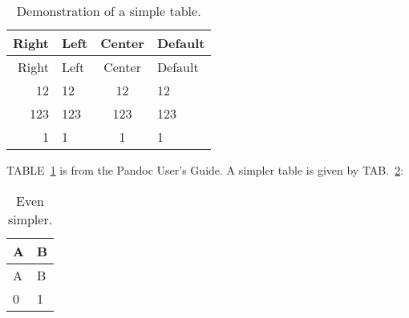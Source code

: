 \providecommand{\crefformat}[2]{}
\providecommand{\Crefformat}[2]{}
\crefformat{table}{TAB.~#2#1#3}
\Crefformat{table}{TABLE~#2#1#3}

\providecommand{\plusnamesingular}{}
\providecommand{\starnamesingular}{}
\providecommand{\cref}{\plusnamesingular~\ref}
\providecommand{\Cref}{\starnamesingular~\ref}

\begin{longtable}[]{@{}rlcl@{}}
\caption{Demonstration of a simple table. \label{tbl:1}}\tabularnewline
\toprule
Right & Left & Center & Default\tabularnewline
\midrule
\endfirsthead
\toprule
Right & Left & Center & Default\tabularnewline
\midrule
\endhead
12 & 12 & 12 & 12\tabularnewline
123 & 123 & 123 & 123\tabularnewline
1 & 1 & 1 & 1\tabularnewline
\bottomrule
\end{longtable}

\protect\renewcommand{\starnamesingular}{TABLE}\Cref{tbl:1} is from the
Pandoc User's Guide. A simpler table is given by
\protect\renewcommand{\plusnamesingular}{TAB.}\cref{tbl:2}:

\begin{longtable}[]{@{}ll@{}}
\caption{Even simpler. \label{tbl:2}}\tabularnewline
\toprule
A & B\tabularnewline
\midrule
\endfirsthead
\toprule
A & B\tabularnewline
\midrule
\endhead
0 & 1\tabularnewline
\bottomrule
\end{longtable}
